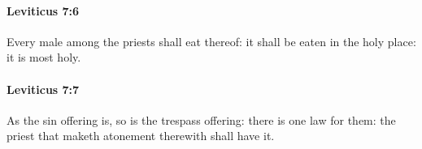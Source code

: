 		\paragraph{Leviticus 7:6} %
			\label{LEVITICUS-7-6}

			Every male among the priests shall eat thereof: it shall be eaten in the holy place: it is most holy.


		\paragraph{Leviticus 7:7} %
			\label{LEVITICUS-7-7}

			As the sin offering is, so is the trespass offering: there is one law for them: the priest that maketh atonement therewith shall have it.


